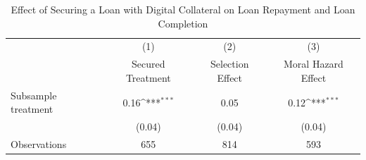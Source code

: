 \begin{table}[htbp]\centering
\def\sym#1{\ifmmode^{#1}\else\(^{#1}\)\fi}
\caption{Effect of Securing a Loan with Digital Collateral on Loan Repayment and Loan Completion\label{LASMH\_complete\_ITT\_200}}
\begin{tabular}{l*{3}{c}}
\toprule
                    &\multicolumn{1}{c}{(1)}&\multicolumn{1}{c}{(2)}&\multicolumn{1}{c}{(3)}\\
                    &\multicolumn{1}{c}{Secured Treatment}&\multicolumn{1}{c}{Selection Effect}&\multicolumn{1}{c}{Moral Hazard Effect}\\
\midrule
Subsample treatment &        0.16\sym{***}&        0.05         &        0.12\sym{***}\\
                    &      (0.04)         &      (0.04)         &      (0.04)         \\
\midrule
Observations        &         655         &         814         &         593         \\
\bottomrule
\end{tabular}
\end{table}
